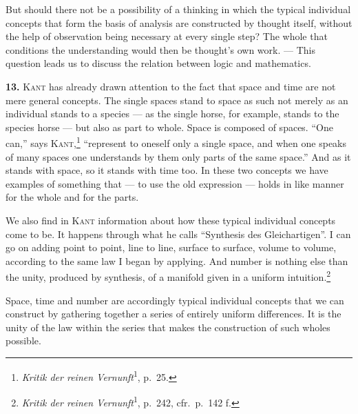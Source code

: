 \documentclass[12pt]{book}
\newcommand{\hnum}[1]{\textbf{#1.}\enspace}
\newcommand{\opage}[1]{\marginnote{\footnotesize\textit{[#1]}}}
\begin{document}
But should there not be a possibility of a thinking in which the typical
individual concepts that form the basis of analysis are constructed by thought
itself, without the help of observation being necessary at every single step? The
whole that conditions the understanding would then be thought's own work. ---
This question leads us to discuss the relation between logic and mathematics.

\hnum{13} \textsc{Kant} has already drawn attention to the fact that space and
time are not mere general concepts. The single spaces stand to space as such not
merely as an individual stands to a species --- as the single horse, for example,
stands to the species horse --- but also as part to whole. Space is composed of
spaces. ``One can,'' says \textsc{Kant},\footnote{\textit{Kritik der reinen
Vernunft}\textsuperscript{1}, p.\ 25.} ``represent to oneself only a single
space, and when one speaks of many spaces one understands by them only parts of
the same space.'' And as it stands with space, so it stands with time too. In
these two concepts we have examples of something that --- to use the old
expression --- holds in like manner for the whole and for the parts.

We also find in \textsc{Kant} information about how these typical individual
concepts come to be. It happens through what he calls ``Synthesis des
Gleichartigen''. I can go on adding point to point, line to line, surface to
surface, volume to volume, according to the same law I began by applying. And
number is \opage{35}nothing else than the unity, produced by synthesis, of a manifold
given in a uniform intuition.\footnote{\textit{Kritik der reinen
Vernunft}\textsuperscript{1}, p.\ 242, cfr.\ p.\ 142 f.}

Space, time and number are accordingly typical individual concepts that we can
construct by gathering together a series of entirely uniform differences. It is
the unity of the law within the series that makes the construction of such wholes
possible.
\end{document}

